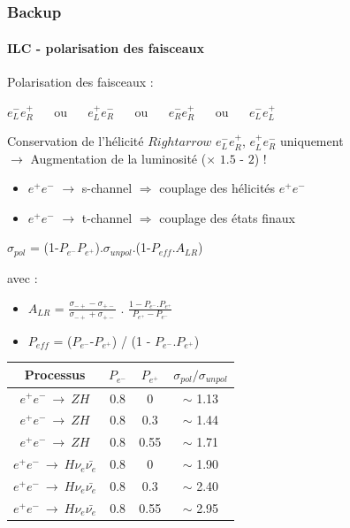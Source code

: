 \documentclass[8pt]{beamer}
\begin{document}

  \section{}
  \newcommand{\backup}{Backup}

  \begin{frame}
  \frametitle{\backup}
  \framesubtitle{ILC - polarisation des faisceaux}

  Polarisation des faisceaux : \\
  \begin{center} $e^{-}_{L}e^{+}_{R}$ ~~ ou ~~ $e^{+}_{L}e^{-}_{R}$ ~~ ou ~~ $e^{-}_{R}e^{+}_{R}$ ~~ ou ~~ $e^{-}_{L}e^{+}_{L}$ \end{center}
  Conservation de l'hélicité $Rightarrow$ $e^{-}_{L}e^{+}_{R}$, $e^{+}_{L}e^{-}_{R}$ uniquement \\
  $\rightarrow$ Augmentation de la luminosité ($\times$ $1.5$ - $2$) ! \\
  \begin{itemize}
    \item $e^+e^-$ $\rightarrow$ s-channel $\Rightarrow$ couplage des hélicités $e^+e^-$
    \item $e^+e^-$ $\rightarrow$ t-channel $\Rightarrow$ couplage des états finaux
  \end{itemize}
  \begin{center} $\sigma_{pol}$ = (1-$P_{e^-}P_{e^+}$).$\sigma_{unpol}$.(1-$P_{eff}.A_{LR}$) \end{center}
  avec :
  \begin{itemize}
    \item $A_{LR}$ = $\frac{\sigma_{-+}-\sigma_{+-}}{\sigma_{-+}+\sigma_{+-}}$ . $\frac{1 - P_{e^-}.P_{e^+}}{P_{e^+}-P_{e^-}}$
    \item $P_{eff}$ = ($P_{e^-}$-$P_{e^+}$) / (1 - $P_{e^-}$.$P_{e^+}$)
  \end{itemize}
  \begin{center}
    \begin{tabular}{c|c|c|c}
      Processus & $P_{e^-}$ & $P_{e^+}$ & $\sigma_{pol}/\sigma_{unpol}$ \\ \hline
      $e^+e^-~\rightarrow~ZH$ & 0.8 & 0    & $\sim$ 1.13 \\
      $e^+e^-~\rightarrow~ZH$ & 0.8 & 0.3  & $\sim$ 1.44 \\
      $e^+e^-~\rightarrow~ZH$ & 0.8 & 0.55 & $\sim$ 1.71 \\ \hline
      $e^+e^-~\rightarrow~H\nu_e \bar{\nu_e}$ & 0.8 & 0    & $\sim$ 1.90 \\
      $e^+e^-~\rightarrow~H\nu_e \bar{\nu_e}$ & 0.8 & 0.3  & $\sim$ 2.40 \\
      $e^+e^-~\rightarrow~H\nu_e \bar{\nu_e}$ & 0.8 & 0.55 & $\sim$ 2.95 \\ \hline
    \end{tabular}
  \end{center}
  \end{frame}
\end{document}
